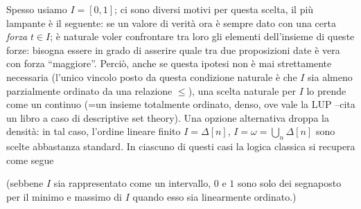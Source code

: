 Spesso usiamo $I=[0,1]$; ci sono diversi motivi per questa scelta, il più lampante è il seguente: se un valore di verità ora è sempre dato con una certa \emph{forza} $t\in I$; è naturale voler confrontare tra loro gli elementi dell'insieme di queste forze: bisogna essere in grado di asserire quale tra due proposizioni date è vera con forza ``maggiore''. Perciò, anche se questa ipotesi non è mai strettamente necessaria (l'unico vincolo posto da questa condizione naturale è che $I$ sia almeno parzialmente ordinato da una relazione $\le$), una scelta naturale per $I$ lo prende come un continuo (=un insieme totalmente ordinato, denso, ove vale la LUP --cita un libro a caso di descriptive set theory). Una opzione alternativa droppa la densità: in tal caso, l'ordine lineare finito $I=\Delta[n]$, $I=\omega = \bigcup_n \Delta[n]$ sono scelte abbastanza standard. In ciascuno di questi casi la logica classica si recupera come segue\todo{\dots}
\begin{center}
\end{center}
(sebbene $I$ sia rappresentato come un intervallo, $0$ e $1$ sono solo dei segnaposto per il minimo e massimo di $I$ quando esso sia linearmente ordinato.)
